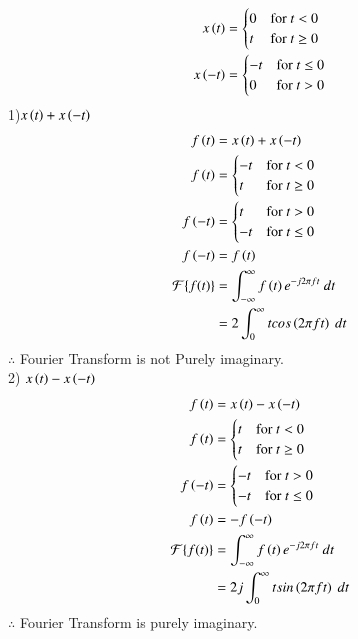 \documentclass[journal,12pt,twocolumn]{IEEEtran}
\theoremstyle{remark}
\begin{document}
\begin{align} 
x\left(t\right) &= 
\begin{cases} 
0 & \text{for } t < 0 \\
t & \text{for } t \geq 0 
\end{cases}\\
x\left(-t\right) &= 
\begin{cases} 
-t & \text{for } t \leq 0 \\
0 & \text{for } t > 0 
\end{cases}
\end{align}
1)$x\left(t\right) + x\left(-t\right)$
\begin{align}
  f\left(t\right)&= x\left(t\right) + x\left(-t\right)\\
  f\left(t\right) &= 
\begin{cases} 
-t & \text{for } t < 0 \\
t & \text{for } t \geq 0 
\end{cases}\\
   f\left(-t\right) &= 
\begin{cases} 
t & \text{for } t > 0 \\
-t & \text{for } t \leq 0 
\end{cases}\\
  f\left(-t\right)&=f\left(t\right)\\
  \mathcal{F}\{f(t)\}&=\int_{-\infty}^{\infty} f\left(t\right) e^{-j 2\pi f t} \ dt\\
  &=2\int_{0}^{\infty} t  cos\left(2\pi ft\right)  \ dt
\end{align}
$\therefore$ Fourier Transform is not Purely imaginary.\\
2) $x\left(t\right) - x\left(-t\right)$
\begin{align}
  f\left(t\right)&= x\left(t\right) - x\left(-t\right)\\
  f\left(t\right) &= 
\begin{cases} 
t & \text{for } t < 0 \\
t & \text{for } t \geq 0 
\end{cases}\\
f\left(-t\right) &= 
\begin{cases} 
-t & \text{for } t > 0 \\
-t & \text{for } t \leq 0 
\end{cases}\\
f\left(t\right)&=-f\left(-t\right)\\
  \mathcal{F}\{f(t)\}&=\int_{-\infty}^{\infty} f\left(t\right) e^{-j 2\pi f t} \ dt\\
  &=2j\int_{0}^{\infty} t  sin\left(2\pi ft\right)  \ dt
\end{align}
$\therefore$ Fourier Transform is purely imaginary.\\
\end{document}
